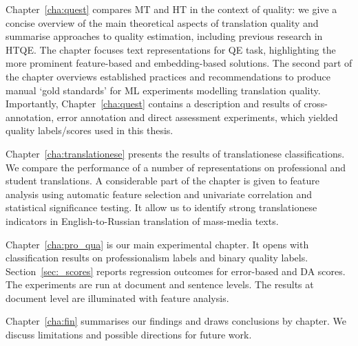 Chapter~\ref{cha:quest} compares MT and \gls{HT} in the context of quality: we give a concise overview of the main theoretical aspects of translation quality and summarise approaches to quality estimation, including previous research in \gls{HTQE}. The chapter focuses text representations for QE task, highlighting the more prominent feature-based and embedding-based solutions. The second part of the chapter overviews established practices and recommendations to produce manual `gold standards' for ML experiments modelling translation quality. Importantly, Chapter~\ref{cha:quest} contains a description and results of cross-annotation, error annotation and direct assessment experiments, which yielded quality labels/scores used in this thesis.

Chapter~\ref{cha:translationese} presents the results of translationese classifications. We compare the performance of a number of representations on professional and student translations. A considerable part of the chapter is given to feature analysis using automatic feature selection and univariate correlation and statistical significance testing. It allow us to identify strong translationese indicators in English-to-Russian translation of mass-media texts.

Chapter~\ref{cha:pro_qua} is our main experimental chapter. It opens with classification results on professionalism labels and binary quality labels. Section~\ref{sec:_scores} reports regression outcomes for error-based and DA scores. The experiments are run at document and sentence levels. The results at document level are illuminated with feature analysis. 

Chapter~\ref{cha:fin} summarises our findings and draws conclusions by chapter. We discuss limitations and possible directions for future work. 